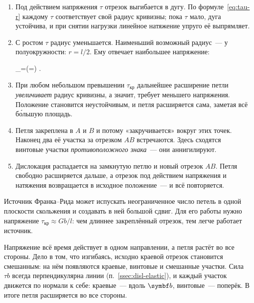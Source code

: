 \begin{enumerate}[label=\arabic*)]
\item Под действием напряжения $\tau$ отрезок выгибается в дугу. По
формуле~\eqref{eq:tau-r} каждому $\tau$ соответствует свой радиус
кривизны; пока $\tau$ мало, дуга устойчива, и при снятии нагрузки линейное
натяжение упруго её выпрямляет.
\item С ростом $\tau$ радиус уменьшается. Наименьший возможный радиус~—
у полуокружности: $r=l/2$. Ему отвечает наибольшее
напряжение:
\begin{keyeq}\label{eq:tau-FR}
\tau_{}=\approx{}\qquad(\alpha=) .
\end{keyeq}
\item При любом небольшом превышении $\tau_{\text{кр}}$ дальнейшее
расширение петли \emph{увеличивает} радиус кривизны, а значит, требует
меньшего напряжения. Положение становится неустойчивым, и петля
расширяется сама, заметая всё бо́льшую площадь.
\item Петля закреплена в $A$ и $B$ и потому «закручивается» вокруг этих
точек. Наконец два её участка за отрезком $AB$ встречаются. Здесь сходятся
винтовые участки \emph{противоположного знака}~— они аннигилируют.
\item Дислокация распадается на замкнутую петлю и новый отрезок $AB$.
Петля свободно расширяется дальше, а отрезок под действием напряжения и
натяжения возвращается в исходное положение~— и всё повторяется.
\end{enumerate}

\begin{glavnoe}
Источник Франка--Рида может испускать неограниченное число петель в
одной плоскости скольжения и создавать в ней большой сдвиг. Для его
работы нужно напряжение $\tau_{\text{кр}}\approx Gb/l$: чем длиннее
закреплённый отрезок, тем легче работает источник.
\end{glavnoe}

\begin{smysl}
Напряжение всё время действует в одном направлении, а петля растёт во все
стороны. Дело в том, что изгибаясь, исходно краевой отрезок становится
смешанным: на нём появляются краевые, винтовые и смешанные участки.
Сила $\tau b$ всегда перпендикулярна линии (п.~\ref{ssec:disl-elastic}),
и каждый участок движется по нормали к себе: краевые~— вдоль $\vb b$,
винтовые~— поперёк. В итоге петля расширяется во все стороны.
\end{smysl}

